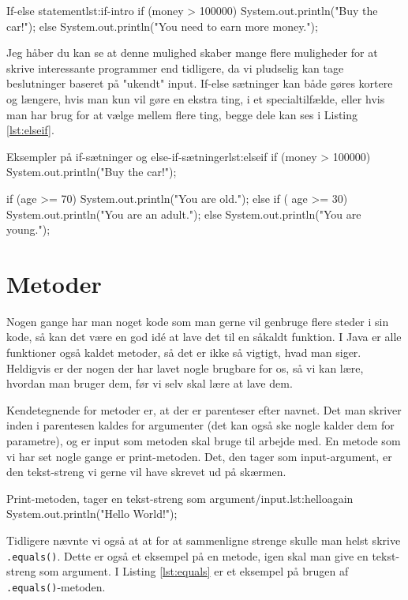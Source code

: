 \begin{JavaCode}{If-else statement}{lst:if-intro}
	if (money > 100000) {
		System.out.println("Buy the car!");
	} else {
		System.out.println("You need to earn more money.");
	}
\end{JavaCode}

Jeg håber du kan se at denne mulighed skaber mange flere muligheder for at skrive interessante programmer end tidligere, da vi pludselig kan tage beslutninger baseret på "ukendt" input. If-else sætninger kan både gøres kortere og længere, hvis man kun vil gøre en ekstra ting, i et specialtilfælde, eller hvis man har brug for at vælge mellem flere ting, begge dele kan ses i Listing \ref{lst:elseif}.

\begin{JavaCode}{Eksempler på if-sætninger og else-if-sætninger}{lst:elseif}
if (money > 100000) {
	System.out.println("Buy the car!");
}

if (age >= 70) {
	System.out.println("You are old.");
} else if ( age >= 30) {
	System.out.println("You are an adult.");
} else {
	System.out.println("You are young.");
}
\end{JavaCode}

\section{Metoder}
Nogen gange har man noget kode som man gerne vil genbruge flere steder i sin kode, så kan det være en god idé at lave det til en såkaldt funktion. I Java er alle funktioner også kaldet metoder, så det er ikke så vigtigt, hvad man siger. Heldigvis er der nogen der har lavet nogle brugbare for os, så vi kan lære, hvordan man bruger dem, før vi selv skal lære at lave dem. 

Kendetegnende for metoder er, at der er parenteser efter navnet. Det man skriver inden i parentesen kaldes for argumenter (det kan også ske nogle kalder dem for parametre), og er input som metoden skal bruge til arbejde med. En metode som vi har set nogle gange er print-metoden. Det, den tager som input-argument, er den tekst-streng vi gerne vil have skrevet ud på skærmen.

\begin{JavaCode}{Print-metoden, tager en tekst-streng som argument/input.}{lst:helloagain}
System.out.println("Hello World!");
\end{JavaCode}

Tidligere nævnte vi også at at for at sammenligne strenge skulle man helst skrive \texttt{.equals()}. Dette er også et eksempel på en metode, igen skal man give en tekst-streng som argument. I Listing \ref{lst:equals} er et eksempel på brugen af \texttt{.equals()}-metoden.

